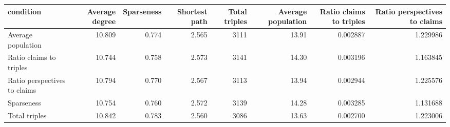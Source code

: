 \begin{tabular}{lrrrrrrr}
\toprule
                   condition &  Average degree &  Sparseness &  Shortest path &  Total triples &  Average population &  Ratio claims to triples &  Ratio perspectives to claims \\
\midrule
          Average population &          10.809 &       0.774 &          2.565 &           3111 &               13.91 &                 0.002887 &                      1.229986 \\
     Ratio claims to triples &          10.744 &       0.758 &          2.573 &           3141 &               14.30 &                 0.003196 &                      1.163845 \\
Ratio perspectives to claims &          10.794 &       0.770 &          2.567 &           3113 &               13.94 &                 0.002944 &                      1.225576 \\
                  Sparseness &          10.754 &       0.760 &          2.572 &           3139 &               14.28 &                 0.003285 &                      1.131688 \\
               Total triples &          10.842 &       0.783 &          2.560 &           3086 &               13.63 &                 0.002700 &                      1.223006 \\
\bottomrule
\end{tabular}

